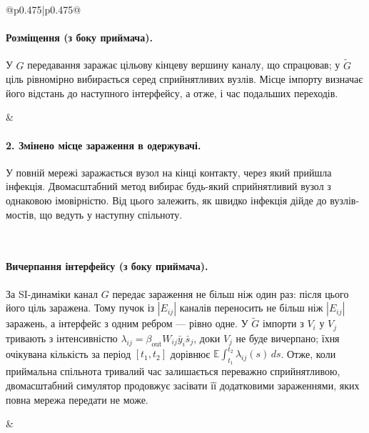 \documentclass[11pt]{article}
\newcommand{\ibar}{\bar{y}}
\newcommand{\sbar}{\bar{s}}
\begin{document}
\begin{longtable}{@{}p{0.475\textwidth}|p{0.475\textwidth}@{}}
\begin{minipage}[t]{\linewidth}
\paragraph{Розміщення (з боку приймача).}
У $G$ передавання заражає цільову кінцеву вершину каналу, що спрацював; у $\tilde G$ ціль рівномірно вибирається серед сприйнятливих вузлів. Місце імпорту визначає його відстань до наступного інтерфейсу, а отже, і час подальших переходів.
\end{minipage} &
\begin{minipage}[t]{\linewidth}
\paragraph{2. Змінено місце зараження в одержувачі.}
У повній мережі заражається вузол на кінці контакту, через який прийшла інфекція. Двомасштабний метод вибирає будь-який сприйнятливий вузол з однаковою імовірністю. Від цього залежить, як швидко інфекція дійде до вузлів-мостів, що ведуть у наступну спільноту.
\end{minipage} \\[5mm]
\begin{minipage}[t]{\linewidth}
\paragraph{Вичерпання інтерфейсу (з боку приймача).}
За SI-динаміки канал $G$ передає зараження не більш ніж один раз: після цього його ціль заражена. Тому пучок із $|E_{ij}|$ каналів переносить не більш ніж $|E_{ij}|$ заражень, а інтерфейс з одним ребром --- рівно одне. У $\tilde G$ імпорти з $V_i$ у $V_j$ тривають з інтенсивністю $\lambda_{ij}=\beta_{\mathrm{out}}W_{ij}\ibar_i\sbar_j$, доки $V_j$ не буде вичерпано; їхня очікувана кількість за період $[t_1,t_2]$ дорівнює $\mathbb{E}\int_{t_1}^{t_2}\lambda_{ij}(s)\,ds$. Отже, коли приймальна спільнота тривалий час залишається переважно сприйнятливою, двомасштабний симулятор продовжує засівати її додатковими зараженнями, яких повна мережа передати не може.
\end{minipage} &
\begin{minipage}[t]{\linewidth}

\end{minipage}
\end{longtable}
\end{document}
